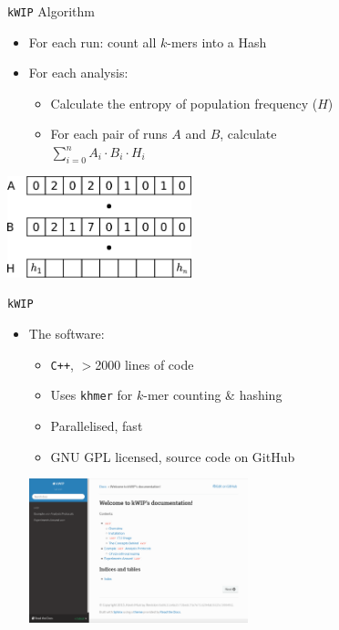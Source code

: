 \documentclass[t]{beamer}
\begin{document}
\begin{frame}{\texttt{kWIP} Algorithm}
  \begin{itemize}
    \item For each run: count all $k$-mers into a Hash
    \item For each analysis:
      \begin{itemize}
        \item Calculate the entropy of population frequency ($H$)
        \item For each pair of runs $A$ and $B$, calculate \\
          $\sum\limits^{n}_{i=0} A_i \cdot B_i \cdot H_i$
      \end{itemize}
  \end{itemize}
  \begin{center}
    \includegraphics[width=0.4\textwidth]{img/hash-wip.png}
  \end{center}
\end{frame}


\begin{frame}{\texttt{kWIP}}
  \begin{itemize}
    \item The software:
      \begin{itemize}
        \item \texttt{C++}, $>$2000 lines of code
        \item Uses \texttt{khmer} for $k$-mer counting \& hashing
        \item Parallelised, fast
        \item GNU GPL licensed, source code on GitHub
      \end{itemize}
      \begin{center}
        \includegraphics[width=0.5\textwidth]{img/kwip-doc-screenshot.png}
      \end{center}
  \end{itemize}
\end{frame}
\end{document}
